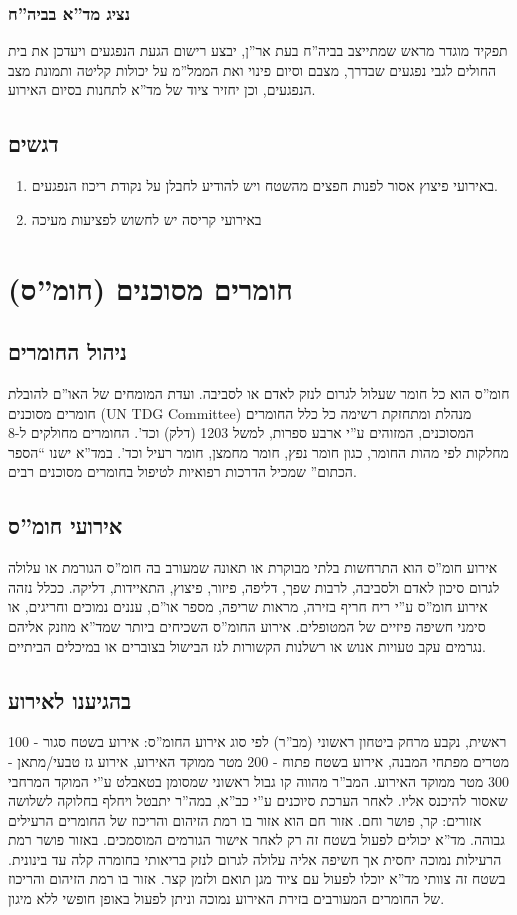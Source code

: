 \documentclass{article}
\begin{document}
\subsubsection{נציג מד''א בביה''ח}
תפקיד מוגדר מראש שמתייצב בביה''ח בעת אר''ן, יבצע רישום הגעת הנפגעים ויעדכן את בית החולים לגבי נפגעים שבדרך, מצבם וסיום פינוי ואת הממל''מ על יכולות קליטה ותמונת מצב הנפגעים, וכן יחזיר ציוד של מד''א לתחנות בסיום האירוע.

\subsection{דגשים}
\begin{enumerate}
    \item באירועי פיצוץ אסור לפנות חפצים מהשטח ויש להודיע לחבלן על נקודת ריכוז הנפגעים.
    \item באירועי קריסה יש לחשוש לפציעות מעיכה
\end{enumerate}

\section{חומרים מסוכנים (חומ''ס)}
\subsection{ניהול החומרים}
חומ''ס הוא כל חומר שעלול לגרום לנזק לאדם או לסביבה. ועדת המומחים של האו''ם להובלת חומרים מסוכנים (\textenglish{UN TDG Committee}) מנהלת ומתחזקת רשימה כל כלל החומרים המסוכנים, המזוהים ע''י ארבע ספרות, למשל \textenglish{1203} (דלק) וכד'. החומרים מחולקים ל-\textenglish{8} מחלקות לפי מהות החומר, כגון חומר נפץ, חומר מחמצן, חומר רעיל וכד'. במד''א ישנו ``הספר הכתום'' שמכיל הדרכות רפואיות לטיפול בחומרים מסוכנים רבים.
\subsection{אירועי חומ''ס}
 אירוע חומ''ס הוא התרחשות בלתי מבוקרת או תאונה שמעורב בה חומ''ס הגורמת או עלולה לגרום סיכון לאדם ולסביבה, לרבות שפך, דליפה, פיזור, פיצוץ, התאיידות, דליקה. ככלל נזהה אירוע חומ''ס ע''י ריח חריף בזירה, מראות שריפה, מספר או''ם, עננים נמוכים וחריגים, או סימני חשיפה פיזיים של המטופלים. אירוע החומ''ס השכיחים ביותר שמד''א מוזנק אליהם נגרמים עקב טעויות אנוש או רשלנות הקשורות לגז הבישול בצוברים או במיכלים הביתיים.

\subsection{בהגיענו לאירוע}
ראשית, נקבע מרחק ביטחון ראשוני (מב''ר) לפי סוג אירוע החומ''ס: אירוע בשטח סגור - 100 מטרים מפתחי המבנה, אירוע בשטח פתוח - 200 מטר ממוקד האירוע, אירוע גז טבעי/מתאן - 300 מטר ממוקד האירוע.
המב''ר מהווה קו גבול ראשוני שמסומן בטאבלט ע''י המוקד המרחבי שאסור להיכנס אליו. לאחר הערכת סיוכנים ע''י כב''א, במה''ר יתבטל ויחלף בחלוקה לשלושה אזורים: קר, פושר וחם. אזור חם הוא אזור בו רמת הזיהום והריכוז של החומרים הרעילים גבוהה. מד''א יכולים לפעול בשטח זה רק לאחר אישור הגורמים המוסמכים. באזור פושר רמת הרעילות נמוכה יחסית אך חשיפה אליה עלולה לגרום לנזק בריאותי בחומרה קלה עד בינונית. בשטח זה צוותי מד''א יוכלו לפעול עם ציוד מגן תואם ולזמן קצר. אזור בו רמת הזיהום והריכוז של החומרים
המעורבים בזירת האירוע נמוכה וניתן לפעול באופן חופשי ללא מיגון.
\end{document}
